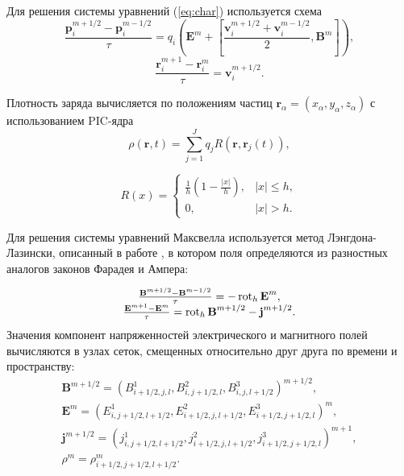 Для решения системы уравнений (\ref{eq:char}) используется схема
$$
\frac{{\textbf{p}}^{m+1/2}_{i}-{\textbf{p}}^{m-1/2}_{i}}{\tau}=q_{i}\left({\textbf{E}}^m+\left[\frac{{\textbf{v}}^{m+1/2}_{i}+{\textbf{v}}^{m-1/2}_{i}}{2},{\textbf{B}}^m \right] \right),
$$
$$
\frac{{\textbf{r}}_{i}^{m+1}-{\textbf{r}}_{i}^{m}}{\tau}={\textbf{v}}^{m+1/2}_{i}.
$$


Плотность заряда вычисляется по положениям частиц ${\textbf{r}}_\alpha=(x_\alpha,y_\alpha,z_\alpha)$ с использованием PIC-ядра 
$$
\rho({\textbf{r}}, t)=\sum_{j=1}^J q_{j} R({\textbf{r}}, {\textbf{r}}_{j}(t)),
$$

\begin{equation}
R(x)=\left\{
\begin{array}{ll}
\displaystyle \frac{1}{h}\left(1-\frac{|x|}{h}\right), & |x|\leq h, \\ 0, & |x|>h.
\end{array} \right.
\end{equation}

Для решения системы уравнений Максвелла используется метод Лэнгдона-Лазински, описанный в работе \cite{lasin}, в котором поля определяются из разностных аналогов законов Фарадея и Ампера:

\begin{equation}
\begin{array}{c}
\frac{{\textbf{B}}^{m+1/2}-{\textbf{B}}^{m-1/2}}{\tau}=-\mathop{\mathrm{rot}}\nolimits_h {\textbf{E}}^m,
\\
\frac{{\textbf{E}}^{m+1}-{\textbf{E}}^m}{\tau}=\mathop{\mathrm{rot}}\nolimits_h {\textbf{B}}^{m+1/2} - {\textbf{j}}^{m+1/2}.
\end{array}
\label{FDTD}
\end{equation}
Значения компонент напряженностей электрического и магнитного полей вычисляются в узлах сеток, смещенных относительно друг друга по времени и пространству:
\begin{equation}
\label{eq:BE}
\begin{array}{c}


{\textbf{B}}^{m+1/2}=(B^1_{i+1/2,j,l}, B^2_{i,j+1/2,l}, B^3_{i,j,l+1/2})^{m+1/2},
\\
{\textbf{E}}^{m}=(E^1_{i,j+1/2,l+1/2}, E^2_{i+1/2,j,l+1/2}, E^3_{i+1/2,j+1/2,l})^m,
\\
{\textbf{j}}^{m+1/2}=(j^1_{i,j+1/2,l+1/2},j^2_{i+1/2,j,l+1/2},j^3_{i+1/2,j+1/2,l})^{m+1},
\\
\rho^m=\rho^m_{i+1/2,j+1/2,l+1/2}. 
\end{array}
\end{equation}


